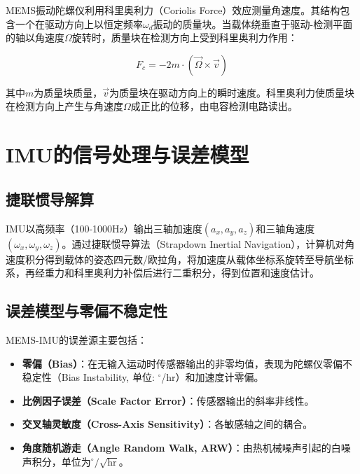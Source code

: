 \documentclass[12pt,a4paper,openany,UTF8]{ctexbook}
\begin{document}
MEMS振动陀螺仪利用科里奥利力（Coriolis Force）效应测量角速度。其结构包含一个在驱动方向上以恒定频率$\omega_d$振动的质量块。当载体绕垂直于驱动-检测平面的轴以角速度$\Omega$旋转时，质量块在检测方向上受到科里奥利力作用：

\begin{equation}\label{eq:coriolis}
F_c = -2m \cdot (\vec{\Omega} \times \vec{v})
\end{equation}

其中$m$为质量块质量，$\vec{v}$为质量块在驱动方向上的瞬时速度。科里奥利力使质量块在检测方向上产生与角速度$\Omega$成正比的位移，由电容检测电路读出。

\section{IMU的信号处理与误差模型}

\subsection{捷联惯导解算}

IMU以高频率（100-1000Hz）输出三轴加速度$(a_x, a_y, a_z)$和三轴角速度$(\omega_x, \omega_y, \omega_z)$。通过捷联惯导算法（Strapdown Inertial Navigation），计算机对角速度积分得到载体的姿态四元数/欧拉角，将加速度从载体坐标系旋转至导航坐标系，再经重力和科里奥利力补偿后进行二重积分，得到位置和速度估计。

\subsection{误差模型与零偏不稳定性}

MEMS-IMU的误差源主要包括：
\begin{itemize}
    \item \textbf{零偏（Bias）}：在无输入运动时传感器输出的非零均值，表现为陀螺仪零偏不稳定性（Bias Instability, 单位: $^\circ$/hr）和加速度计零偏。
    \item \textbf{比例因子误差（Scale Factor Error）}：传感器输出的斜率非线性。
    \item \textbf{交叉轴灵敏度（Cross-Axis Sensitivity）}：各敏感轴之间的耦合。
    \item \textbf{角度随机游走（Angle Random Walk, ARW）}：由热机械噪声引起的白噪声积分，单位为$^\circ/\sqrt{\text{hr}}$。
\end{itemize}
\end{document}
